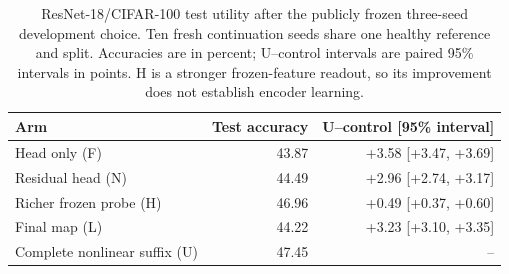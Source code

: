 \begin{table}[t]
\centering
\caption{ResNet-18/CIFAR-100 test utility after the publicly frozen three-seed development choice. Ten fresh continuation seeds share one healthy reference and split. Accuracies are in percent; U--control intervals are paired 95\% intervals in points. H is a stronger frozen-feature readout, so its improvement does not establish encoder learning.}
\label{tab:suffix_confirmation}
\begin{tabular}{lrr}
\toprule
Arm & Test accuracy & U--control [95\% interval] \\
\midrule
Head only (F) & 43.87 & +3.58 [+3.47, +3.69] \\
Residual head (N) & 44.49 & +2.96 [+2.74, +3.17] \\
Richer frozen probe (H) & 46.96 & +0.49 [+0.37, +0.60] \\
Final map (L) & 44.22 & +3.23 [+3.10, +3.35] \\
Complete nonlinear suffix (U) & 47.45 & -- \\
\bottomrule
\end{tabular}
\end{table}
